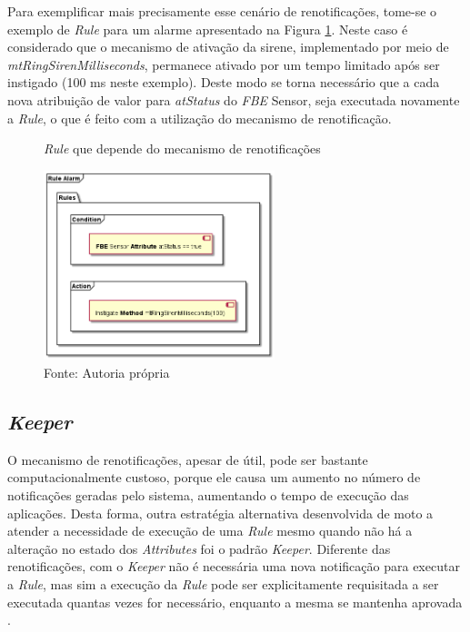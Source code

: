 \FloatBarrier

Para exemplificar mais precisamente esse cenário de renotificações, tome-se o
exemplo de \textit{Rule} para um alarme apresentado na Figura
\ref{fig:ex_rule_renotif}. Neste caso é considerado que o mecanismo de ativação
da sirene, implementado por meio de \textit{mtRingSirenMilliseconds}, permanece
ativado por um tempo limitado após ser instigado (100 ms neste exemplo). Deste
modo se torna necessário que a cada nova atribuição de valor para
\textit{atStatus} do \textit{FBE} Sensor, seja executada novamente a
\textit{Rule}, o que é feito com a utilização do mecanismo de renotificação.

\begin{figure}[!htb]
  \centering
  \caption{\textit{Rule} que depende do mecanismo de renotificações}
  \includegraphics[width=0.6\textwidth]{../out/diagrams/rule_renotif/rules_renotif.png}
  \smallskip
  \caption*{Fonte: Autoria própria}
  \label{fig:ex_rule_renotif}
\end{figure}

\subsection{\textit{Keeper}}

O mecanismo de renotificações, apesar de útil, pode ser bastante
computacionalmente custoso, porque ele causa um aumento no número de
notificações geradas pelo sistema, aumentando o tempo de execução das
aplicações. Desta forma, outra estratégia alternativa desenvolvida de moto a
atender a necessidade de execução de uma \textit{Rule} mesmo quando não há a
alteração no estado dos \textit{Attributes} foi o padrão \textit{Keeper}.
Diferente das renotificações, com o \textit{Keeper} não é necessária uma nova
notificação para executar a \textit{Rule}, mas sim a execução da \textit{Rule}
pode ser explicitamente requisitada a ser executada quantas vezes for
necessário, enquanto a mesma se mantenha aprovada \cite{muchalski_2012}.

